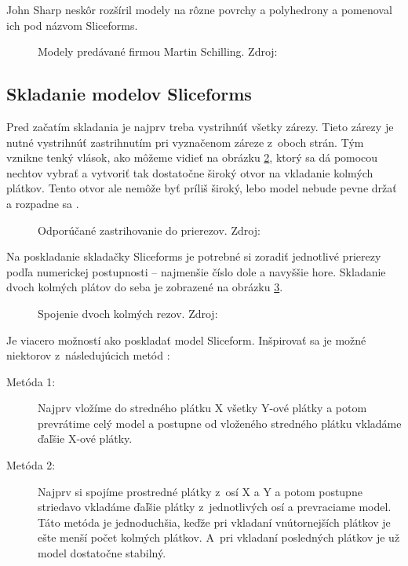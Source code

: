 John Sharp neskôr rozšíril modely na rôzne povrchy a polyhedrony a pomenoval ich pod názvom Sliceforms.


\begin{figure}[H]
\centering
{}
\caption{Modely predávané firmou Martin Schilling.  Zdroj: \cite{kerrycue2013}
} 
\label{fig:MartinSchilling}
\end{figure}

\subsection{Skladanie modelov Sliceforms}
Pred začatím skladania je najprv treba vystrihnúť všetky zárezy. Tieto zárezy je nutné vystrihnúť zastrihnutím pri vyznačenom záreze z~oboch strán.
Tým vznikne tenký vlások, ako môžeme vidieť na obrázku \ref{fig:zastrihovanie}, ktorý sa dá pomocou nechtov vybrať a vytvoriť tak dostatočne široký otvor na vkladanie kolmých plátkov. Tento otvor ale nemôže byť príliš široký, lebo model nebude pevne držať a rozpadne sa \cite{johnsharp2010assemble}.
\begin{figure}[H]
\centering
{}
\caption{Odporúčané zastrihovanie do prierezov. Zdroj:~\protect\cite{johnsharp2010assemble}}\label{fig:zastrihovanie}
\end{figure}


Na poskladanie skladačky Sliceforms je potrebné si zoradiť jednotlivé prierezy podľa numerickej postupnosti -- najmenšie číslo dole a navyššie hore. Skladanie dvoch kolmých plátov do seba je zobrazené na obrázku \ref{fig:vkladanie}.
\begin{figure}[H]
\centering
{}
\caption{Spojenie dvoch kolmých rezov. Zdroj:~\protect\cite{johnsharp2010assemble}}
\label{fig:vkladanie}
\end{figure}

Je viacero možností ako poskladať model Sliceform. Inšpirovať sa je možné niektorov z~následujúcich metód \cite{sharp1995sliceforms}: 
\begin{description}
\item[Metóda 1:] Najprv vložíme do stredného plátku X všetky Y-ové plátky a potom prevrátime celý model a postupne od vloženého stredného plátku vkladáme ďaľšie X-ové plátky.
\item[Metóda 2:] Najprv si spojíme prostredné plátky z~osí X a Y a potom postupne striedavo vkladáme ďaľšie plátky z~jednotlivých osí a prevraciame model. Táto metóda je jednoduchšia, keďže pri vkladaní vnútornejších plátkov je ešte menší počet kolmých plátkov. A~pri vkladaní posledných plátkov je už model dostatočne stabilný.
\end{description}

